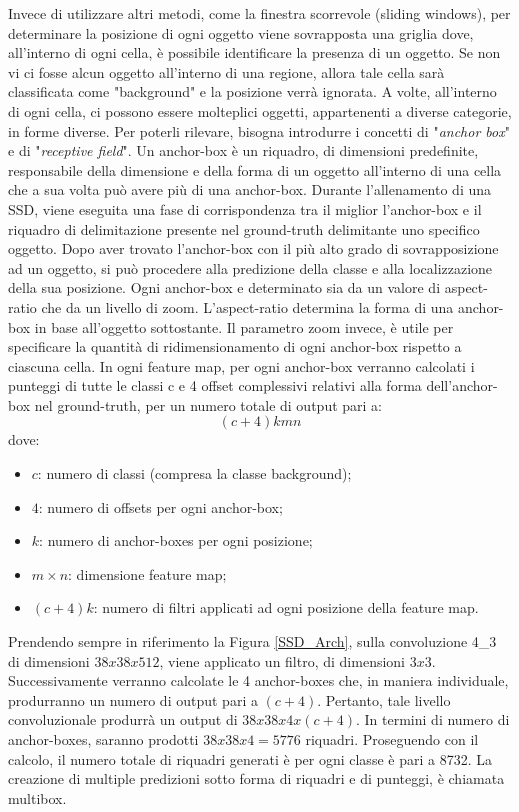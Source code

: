 Invece di utilizzare altri metodi, come la finestra scorrevole (sliding windows), per determinare la posizione di ogni oggetto viene sovrapposta una griglia dove, all'interno di ogni cella, è possibile identificare la presenza di un oggetto. Se non vi ci fosse alcun oggetto all'interno di una regione, allora tale cella sarà classificata come "background" e la posizione verrà ignorata. A volte, all'interno di ogni cella, ci possono essere molteplici oggetti, appartenenti a diverse categorie, in forme diverse. Per poterli rilevare, bisogna introdurre i concetti di "\emph{anchor box}" e di "\emph{receptive field}". 
Un anchor-box è un riquadro, di dimensioni predefinite, responsabile della dimensione e della forma di un oggetto all'interno di una cella che a sua volta può avere più di una anchor-box. Durante l'allenamento di una SSD, viene eseguita una fase di corrispondenza tra il miglior l'anchor-box e il riquadro di delimitazione presente nel ground-truth delimitante uno specifico oggetto. Dopo aver trovato l'anchor-box con il più alto grado di sovrapposizione ad un oggetto, si può procedere alla predizione della classe e alla localizzazione della sua posizione. Ogni anchor-box e determinato sia da un valore di aspect-ratio che da un livello di zoom. L'aspect-ratio determina la forma di una anchor-box in base all'oggetto sottostante. Il parametro zoom invece, è utile per specificare la quantità di ridimensionamento di ogni anchor-box rispetto a ciascuna cella.
In ogni feature map, per ogni anchor-box verranno calcolati i punteggi di tutte le classi c e 4 offset complessivi relativi alla forma dell'anchor-box nel ground-truth, per un numero totale di output pari a:
\begin{equation}
    (c+4)kmn
\end{equation}
dove:
\begin{itemize}
    \item $c$: numero di classi (compresa la classe background);
    \item $4$: numero di offsets per ogni anchor-box;
    \item $k$: numero di anchor-boxes per ogni posizione;
    \item $m \times n$: dimensione feature map;
    \item $(c+4)k$: numero di filtri applicati ad ogni posizione della feature map.
\end{itemize}
Prendendo sempre in riferimento la Figura \ref{SSD_Arch}, sulla convoluzione 4\_3 di dimensioni $38x38x512$, viene applicato un filtro, di dimensioni $3x3$.
Successivamente verranno calcolate le 4 anchor-boxes che, in maniera individuale, produrranno un numero di output pari a $(c+4)$. Pertanto, tale livello convoluzionale produrrà un output di $38x38x4x(c+4)$.
In termini di numero di anchor-boxes, saranno prodotti $38x38x4=5776$ riquadri. Proseguendo con il calcolo, il numero totale di riquadri generati è per ogni classe è pari a 8732.
La creazione di multiple predizioni sotto forma di riquadri e di punteggi, è chiamata multibox. 

